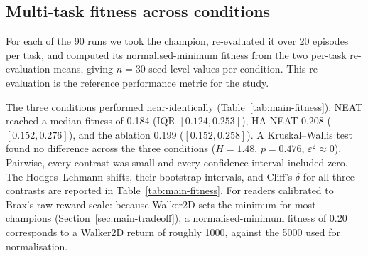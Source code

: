 \documentclass[12pt]{article}
\newcommand{\revBrit}[2]{#2}
\newcommand{\revNota}[2]{#2}
\newcommand{\revAcro}[2]{#2}
\begin{document}
\subsection{Multi-task fitness across conditions}
\label{sec:main-study}
For each of the 90 runs we took the champion, re-evaluated it over 20 episodes per task, and computed its normalised-minimum fitness from the two per-task re-evaluation means, giving $n = 30$ seed-level values per condition.
This re-evaluation is the reference performance metric for the study.

The three conditions performed near-identically (Table~\ref{tab:main-fitness}).
NEAT reached a median fitness of 0.184 \revAcro{A-04}{(IQR $[0.124, 0.253]$)}, HA-NEAT 0.208 ($[0.152, 0.276]$), and the ablation 0.199 ($[0.152, 0.258]$).
A Kruskal--Wallis test found no difference across the three conditions ($H = 1.48$, $p = 0.476$, $\revNota{N-07}{\varepsilon^2 \approx 0}$).
Pairwise, every contrast was small and every confidence interval included zero. The Hodges--Lehmann shifts, their bootstrap intervals, and Cliff's $\delta$ for all three contrasts are reported in Table~\ref{tab:main-fitness}.
For readers calibrated to Brax's raw reward scale: because Walker2D sets the minimum for most champions (Section~\ref{sec:main-tradeoff}), a normalised-minimum fitness of 0.20 corresponds to a Walker2D return of roughly 1000, against the 5000 \revBrit{E-09}{used for normalisation}.
\end{document}
